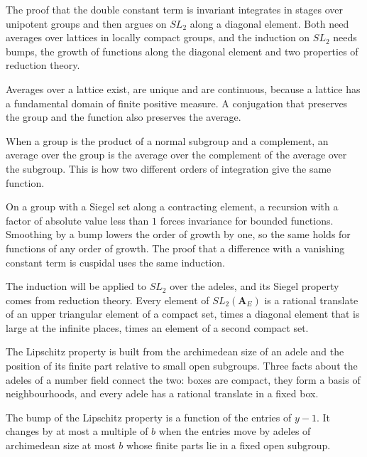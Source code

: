 The proof that the double constant term is invariant integrates in stages over
unipotent groups and then argues on $SL_2$ along a diagonal element. Both need
averages over lattices in locally compact groups, and the induction on $SL_2$
needs bumps, the growth of functions along the diagonal element and two
properties of reduction theory.

Averages over a lattice exist, are unique and are continuous, because a lattice
has a fundamental domain of finite positive measure. A conjugation that
preserves the group and the function also preserves the average.

When a group is the product of a normal subgroup and a complement, an average
over the group is the average over the complement of the average over the
subgroup. This is how two different orders of integration give the same
function.

On a group with a Siegel set along a contracting element, a recursion with a
factor of absolute value less than $1$ forces invariance for bounded functions.
Smoothing by a bump lowers the order of growth by one, so the same holds for
functions of any order of growth. The proof that a difference with a vanishing
constant term is cuspidal uses the same induction.

The induction will be applied to $SL_2$ over the adeles, and its Siegel
property comes from reduction theory. Every element of $SL_2(\mathbf A_E)$ is a
rational translate of an upper triangular element of a compact set, times a
diagonal element that is large at the infinite places, times an element of a
second compact set.

The Lipschitz property is built from the archimedean size of an adele and the
position of its finite part relative to small open subgroups. Three facts about
the adeles of a number field connect the two: boxes are compact, they form a
basis of neighbourhoods, and every adele has a rational translate in a fixed
box.

The bump of the Lipschitz property is a function of the entries of $y-1$. It
changes by at most a multiple of $b$ when the entries move by adeles of
archimedean size at most $b$ whose finite parts lie in a fixed open subgroup.


